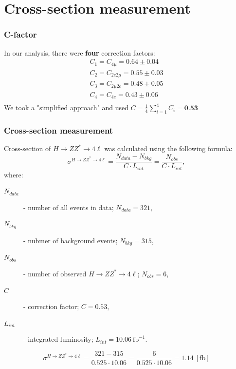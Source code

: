 \documentclass[aspectratio=1610, english]{beamer}
\newcommand{\hzz}{ H\rightarrow ZZ^{*}\rightarrow 4 \ell}
\begin{document}
\section{Cross-section measurement}

\begin{frame}
\frametitle{C-factor}
In our analysis, there were \textbf{four} correction factors:
\begin{eqnarray}
C_1=C_{4\mu}=0.64 \pm 0.04 \nonumber \\
C_2=C_{2e2\mu}=0.55 \pm 0.03 \nonumber \\
C_3=C_{2\mu2e}=0.48 \pm 0.05 \nonumber \\
C_4=C_{4e}=0.43 \pm 0.06 \nonumber \\
\end{eqnarray}
\vspace{1cm}
We took a "simplified approach" and used $C=\frac{1}{4}\sum_{i=1}^{4} C_i=\textbf{0.53}$
\end{frame}

\begin{frame}
\frametitle{Cross-section measurement}
Cross-section of $\hzz$ was calculated using the following formula:
\begin{equation}
\sigma^{\hzz}=\frac{N_{data}-N_{bkg}}{C\cdot L_{int}}=\frac{N_{obs}}{C\cdot L_{int}} ,
\end{equation}
where:
\begin{description}
\item[$N_{data}$] - number of all events in data; $N_{data}=321$,
\item[$N_{bkg}$] - nubmer of background events; $N_{bkg}=315$,
\item[$N_{obs}$] - number of observed $\hzz$; $N_{obs}=6$,
\item[$C$] - correction factor; $C=0.53$,
\item[$L_{int}$] - integrated luminosity; $L_{int}=10.06 \: \mathrm{fb}^{-1}$.
\end{description}
\vspace{1cm}
\begin{equation}
\sigma^{\hzz}=\frac{321-315}{0.525\cdot 10.06}=\frac{6}{0.525\cdot 10.06}=1.14 \: [\mathrm{fb}]
\end{equation}

\end{frame}
\end{document}
